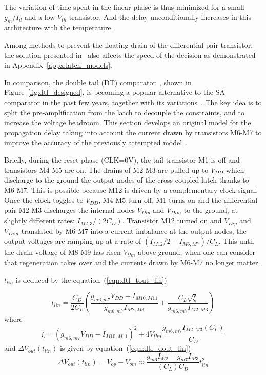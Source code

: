 The variation of time spent in the linear phase is thus minimized for a small \(g_m/I_d\) and a low-\(V_{th}\) transistor. And the delay unconditionally increases in this architecture with the temperature.

Among methods to prevent the floating drain of the differential pair transistor, the solution presented in~\cite{Montanaro1996} also affects the speed of the decision as demonstrated in Appendix~\ref{appx:latch_models}.

In comparison, the double tail (DT) comparator~\cite{Schinkel2007}, shown in Figure~\ref{fig:dtl_designed}, is becoming a popular alternative to the SA comparator in the past few years, together with its variations~\cite{Miyahara2008,Babayan2014,Khorami2016}. The key idea is to split the pre-amplification from the latch to decouple the constraints, and to increase the voltage headroom. This section develops an original model for the propagation delay taking into account the current drawn by transistors M6-M7 to improve the accuracy of the previously attempted model~\cite{Babayan2014}.

Briefly, during the reset phase (CLK=0V), the tail transistor M1 is off and transistors M4-M5 are on. The drains of M2-M3 are pulled up to \(V_{DD}\) which discharge to the ground the output nodes of the cross-coupled latch thanks to M6-M7. This is possible because M12 is driven by a complementary clock signal.
Once the clock toggles to \(V_{DD}\), M4-M5 turn off, M1 turns on and the differential pair M2-M3 discharges the internal nodes \(V_{Dip}\) and \(V_{Dim}\) to the ground, at slightly different rates: \(I_{M2,3}/(2C_{D})\). Transistor M12 turned on and \(V_{Dip}\) and \(V_{Dim}\) translated by M6-M7 into a current imbalance at the output nodes, the output voltages are ramping up at a rate of \((I_{M12}/2-I_{M6,M7})/C_{L}\). This until the drain voltage of M8-M9 has risen \(V_{thn}\) above ground, when one can consider that regeneration takes over and the currents drawn by M6-M7 no longer matter. 

\(t_{lin}\) is deduced by the equation~(\ref{eqn:dtl_tout_lin})

\begin{equation}
\label{eqn:dtl_tout_lin}
t_{lin} = \frac{C_D}{2C_L} \left(\frac{g_{m6,m7}V_{DD}-I_{M10,M11}}{g_{m6,m7}I_{M2,M3}} + \frac{C_L\sqrt{\xi}}{g_{m6,m7}I_{M2,M3}} \right)
\end{equation}
where 
\begin{equation}
\xi = {\left(g_{m6,m7}V_{DD}-I_{M10,M11}\right)}^2  + 4V_{thn}\frac{g_{m6,m7}I_{M2,M3}(C_{L})}{C_D}
\end{equation}
and \(\Delta V_{out}(t_{lin})\) is given by equation~(\ref{eqn:dtl_dout_lin})
\begin{equation}
\label{eqn:dtl_dout_lin}
\Delta V_{out}(t_{lin}) = V_{op}-V_{om} \approx \frac{g_{m6}I_{M2}-g_{m7}I_{M3}}{(C_{L})C_D}t_{lin}^2
\end{equation}

